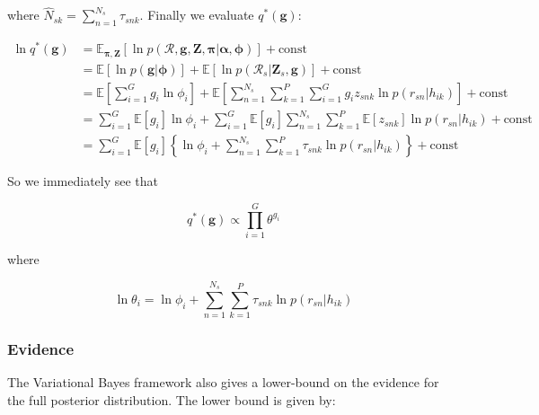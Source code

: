 \documentclass{article}
\begin{document}
where $\hat{N}_{sk} = \sum_{n = 1}^{N_s} \tau_{snk}$. Finally we evaluate $q^*(\boldsymbol{g})$:

\begin{align}
\label{eq:cnv_ln_q_g}
\ln q^*(\boldsymbol{g}) &= \mathbb{E}_{\boldsymbol{\pi}, \boldsymbol{Z}} [\ln p(\mathcal{R}, \boldsymbol{g}, \boldsymbol{Z}, \boldsymbol{\pi} | \boldsymbol{\alpha}, \boldsymbol{\phi})] + \text{const} \\
&= \mathbb{E}[\ln p(\boldsymbol{g} | \boldsymbol{\phi})] + \mathbb{E}[\ln p(\mathcal{R}_s | \boldsymbol{Z}_s, \boldsymbol{g})] + \text{const} \\
&= \mathbb{E} \left [\sum_{i = 1}^G g_i \ln \phi_i \right] + \mathbb{E} \left[ \sum_{n = 1}^{N_s} \sum_{k = 1}^P \sum_{i = 1}^G g_i z_{snk} \ln p(r_{sn} | h_{ik}) \right] + \text{const} \\
&= \sum_{i = 1}^G \mathbb{E}[g_i] \ln \phi_i +  \sum_{i = 1}^G \mathbb{E}[g_i] \sum_{n = 1}^{N_s} \sum_{k = 1}^P \mathbb{E}[z_{snk}] \ln p(r_{sn} | h_{ik}) + \text{const} \\
&= \sum_{i = 1}^G \mathbb{E}[g_i] \left\{ \ln \phi_i + \sum_{n = 1}^{N_s} \sum_{k = 1}^P \tau_{snk} \ln p(r_{sn} | h_{ik}) \right\} + \text{const}
\end{align}

So we immediately see that

\begin{equation}
\label{eq:cnv_q_g}
q^*(\boldsymbol{g}) \propto \prod_{i = 1}^G \theta^{g_i}
\end{equation}

where

\begin{equation}
\label{eq:cnv_theta}
\ln \theta_i = \ln \phi_i + \sum_{n = 1}^{N_s} \sum_{k = 1}^P \tau_{snk} \ln p(r_{sn} | h_{ik})
\end{equation}

\subsubsection{Evidence}

The Variational Bayes framework also gives a lower-bound on the evidence for the full posterior distribution. The lower bound is given by:
\end{document}

